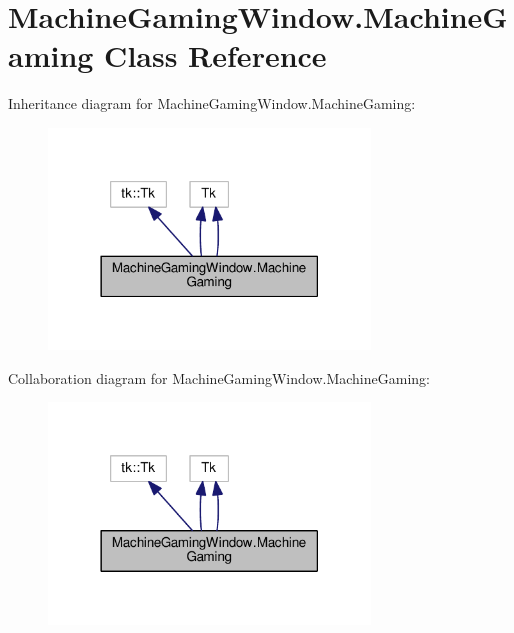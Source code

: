 \hypertarget{classMachineGamingWindow_1_1MachineGaming}{}\section{Machine\+Gaming\+Window.\+Machine\+Gaming Class Reference}
\label{classMachineGamingWindow_1_1MachineGaming}


Inheritance diagram for Machine\+Gaming\+Window.\+Machine\+Gaming\+:\nopagebreak
\begin{figure}[H]
\begin{center}
\leavevmode
\includegraphics[width=242pt]{classMachineGamingWindow_1_1MachineGaming__inherit__graph}
\end{center}
\end{figure}


Collaboration diagram for Machine\+Gaming\+Window.\+Machine\+Gaming\+:\nopagebreak
\begin{figure}[H]
\begin{center}
\leavevmode
\includegraphics[width=242pt]{classMachineGamingWindow_1_1MachineGaming__coll__graph}
\end{center}
\end{figure}
